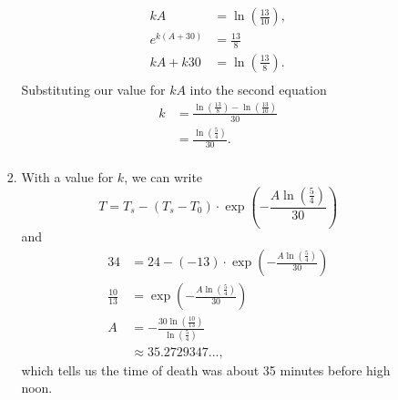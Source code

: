\documentclass[10pt]{article}
\begin{document}
\begin{enumerate}
\begin{enumerate}
\begin{enumerate}
\begin{align*}
                        kA &= \ln\left(\tfrac{13}{10}\right), \\
                        e^{k(A+30)} &= \frac{13}{8} \\
                        kA+k30 &= \ln\left(\tfrac{13}{8}\right). \\
                    \end{align*}
                    Substituting our value for $kA$ into the second equation
                    \begin{align*}
                        k &= \frac{\ln\left(\tfrac{13}{8}\right) - \ln\left(\tfrac{13}{10}\right)}{30} \\
                        &= \frac{\ln\left(\tfrac{5}{4}\right)}{30}. \\
                    \end{align*}
                \item With a value for $k$, we can write
                        $$T = T_s - (T_s - T_0)\cdot\exp{\left(-\frac{A\ln\left(\tfrac{5}{4}\right)}{30}\right)}$$
                    and
                    \begin{align*}
                        34 &= 24 - (-13)\cdot\exp{\left(-\frac{A\ln\left(\tfrac{5}{4}\right)}{30}\right)} \\
                        \frac{10}{13} &= \exp{\left(-\frac{A\ln\left(\tfrac{5}{4}\right)}{30}\right)} \\
                        A &= -\frac{30\ln\left(\tfrac{10}{13}\right)}{\ln\left(\tfrac{5}{4}\right)} \\
                        &\approx 35.2729347...,
                    \end{align*}
                    which tells us the time of death was about 35 minutes before
                    high noon.
            \end{enumerate}
        \end{enumerate}
    \end{enumerate}
\end{document}
